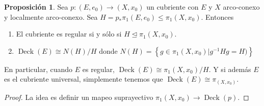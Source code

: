 \documentclass[spanish]{article}
\theoremstyle{definition}
\newtheorem*{prop}{Proposición}
\DeclareMathOperator{\Deck}{Deck}
\begin{document}
\begin{prop}
	Sea $p:( E, e_0)\to (X,x_0)$ un cubriente con $ E$ y $X$ arco-conexo y localmente arco-conexo. Sea $H=p_*\pi_1( E, e_0)\leq\pi_1(X,x_0)$. Entonces
	\begin{enumerate}[label=\alph*)]
		\item El cubriente es regular si y sólo si $H\trianglelefteq\pi_1(X,x_0)$.
		\item $\Deck( E)\cong N(H)/H$
		donde $N(H)=\left\{g\in\pi_1(X,x_0)|g^{-1}Hg=H)\right\}$
	\end{enumerate}
	En particular, cuando $ E$ es regular, $\Deck( E)\cong\pi_1(X,x_0)/H$. Y si además $ E$ es el cubriente universal, simplemente tenemos que $\Deck( E)\cong\pi_(X,x_0)$.
\end{prop}
\begin{proof}
	La idea es definir un mapeo suprayectivo $\pi_1(X,x_0)\to\Deck(p)$.
\end{proof}
\end{document}
